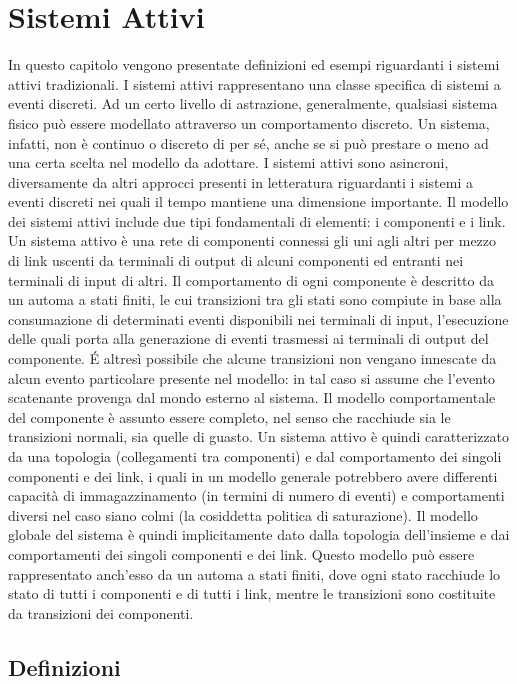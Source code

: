 \chapter{Sistemi Attivi}
In questo capitolo vengono presentate definizioni ed esempi riguardanti i sistemi attivi tradizionali.
I sistemi attivi rappresentano una classe specifica di sistemi a eventi discreti. Ad un certo livello di astrazione, generalmente, qualsiasi sistema fisico può essere modellato attraverso un comportamento discreto. Un sistema, infatti, non è continuo o discreto di per sé, anche se si può prestare o meno ad una certa scelta nel modello da adottare. I sistemi attivi sono asincroni, diversamente da altri approcci presenti in letteratura riguardanti i sistemi a eventi discreti nei quali il tempo mantiene una dimensione importante.
Il modello dei sistemi attivi include due tipi fondamentali di elementi: i componenti e i link. Un sistema attivo è una rete di componenti connessi gli uni agli altri per mezzo di link uscenti da terminali di output di alcuni componenti ed entranti nei terminali di input di altri. Il comportamento di ogni componente è descritto da un automa a stati finiti, le cui transizioni tra gli stati sono compiute in base alla consumazione di determinati eventi disponibili nei terminali di input, l'esecuzione delle quali porta alla generazione di eventi trasmessi ai terminali di output del componente. \'E altresì possibile che alcune transizioni non vengano innescate da alcun evento particolare presente nel modello: in tal caso si assume che l'evento scatenante provenga dal mondo esterno al sistema. Il modello comportamentale del componente è assunto essere completo, nel senso che racchiude sia le transizioni normali, sia quelle di guasto.
Un sistema attivo è quindi caratterizzato da una topologia (collegamenti tra componenti) e dal comportamento dei singoli componenti e dei link, i quali in un modello generale potrebbero avere differenti capacità di immagazzinamento (in termini di numero di eventi) e comportamenti diversi nel caso siano colmi (la cosiddetta politica di saturazione).
Il modello globale del sistema è quindi implicitamente dato dalla topologia dell'insieme e dai comportamenti dei singoli componenti e dei link. Questo modello può essere rappresentato anch'esso da un automa a stati finiti, dove ogni stato racchiude lo stato di tutti i componenti e di tutti i link, mentre le transizioni sono costituite da transizioni dei componenti.

\section{Definizioni}

